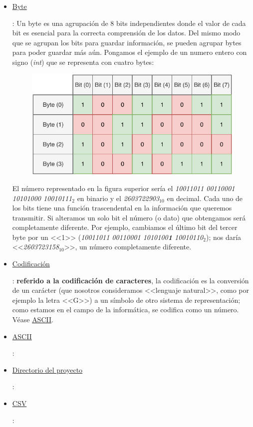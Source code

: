 \documentclass[11pt, oneside]{book}		%
\begin{document}
\begin{itemize}
	\item \hypertarget{byteDef}{\hyperlink{byteRet}{Byte}}: Un byte es una agrupación de 8 bits independientes donde el valor de cada bit es esencial para la correcta comprensión de los datos. Del mismo modo que se agrupan los bits para guardar información, se pueden agrupar bytes para poder guardar más aún. Pongamos el ejemplo de un numero entero con signo (\textit{int}) que se representa con cuatro bytes:
	\begin{figure}[H]
		\centering
		\includegraphics{img/Definiciones/Byte/byte1.pdf}
	\end{figure} 
	El número representado en la figura superior sería el \textit{10011011 00110001 10101000 10010111}$_{2}$ en binario y el \textit{2603722903}$_{10}$ en decimal. Cada uno de los bits tiene una función trascendental en la información que queremos transmitir. Si alteramos un solo bit el número (o dato) que obtengamos será completamente diferente. Por ejemplo, cambiamos el último bit del tercer byte por un <<1>> (\textit{10011011 00110001 1010100\textbf{1} 10010110}$_{2}$); nos daría <<\textit{2603723158}$_{10}$>>, un número completamente diferente.

	\item \hypertarget{codificacionDef}{\hyperlink{codificacionRet}{Codificación}}: \textbf{referido a la codificación de caracteres}, la codificación es la conversión de un carácter (que nosotros consideramos <<lenguaje natural>>, como por ejemplo la letra <<G>>) a un símbolo de otro sistema de representación; como estamos en el campo de la informática, se codifica como un número. Véase \hypertarget{ASCIIRet}{\hyperlink{ASCIIDef}{ASCII}}.
	
	\item \hypertarget{ASCIIDef}{\hyperlink{ASCIIRet}{ASCII}}:
	
	\item \hypertarget{curdirDef}{\hyperlink{curdirRet}{Directorio del proyecto}}:
	
	\item \hypertarget{CSVDef}{\hyperlink{CSVRet}{CSV}}:
		
\end{itemize}


 

\end{document}
